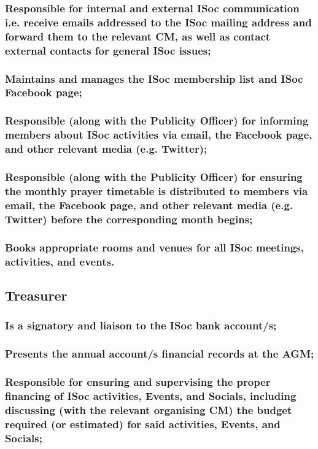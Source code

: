 \documentclass[12pt]{article}
\begin{document}
\subsubsection{Responsible for internal and external ISoc communication i.e. receive emails addressed to the ISoc mailing address and forward them to the relevant CM, as well as contact external contacts for general ISoc issues;}
\subsubsection{Maintains and manages the ISoc membership list and ISoc Facebook page;}
\subsubsection{Responsible (along with the Publicity Officer) for informing members about ISoc activities via email, the Facebook page, and other relevant media (e.g. Twitter);}
\subsubsection{Responsible (along with the Publicity Officer) for ensuring the monthly prayer timetable is distributed to members via email, the Facebook page, and other relevant media (e.g. Twitter) before the corresponding month begins;}
\subsubsection{Books appropriate rooms and venues for all ISoc meetings, activities, and events.}
\hspace{1pt}

\subsection{Treasurer}
\subsubsection{Is a signatory and liaison to the ISoc bank account/s;}
\subsubsection{Presents the annual account/s financial records at the AGM;}\hspace{1pt}
\subsubsection{Responsible for ensuring and supervising the proper financing of ISoc activities, Events, and Socials, including discussing (with the relevant organising CM) the budget required (or estimated) for said activities, Events, and Socials;}
\end{document}
